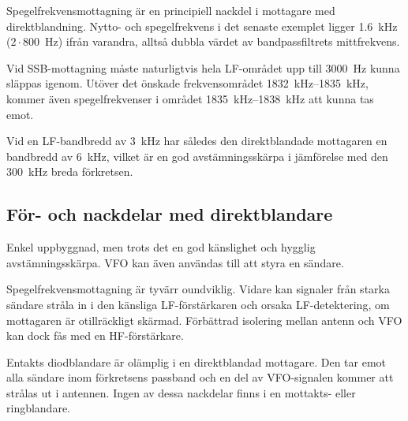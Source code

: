 Spegelfrekvensmottagning är en principiell nackdel i mottagare med
direktblandning.
Nytto- och spegelfrekvens i det senaste exemplet ligger
\SI{1,6}{\kilo\hertz} ($2\cdot 800$~\si{\hertz}) ifrån varandra, alltså dubbla värdet
av bandpassfiltrets mittfrekvens.

Vid SSB-mottagning måste naturligtvis hela LF-området upp till \SI{3000}{\hertz}
kunna släppas igenom.
Utöver det önskade frekvensområdet \SIrange{1832}{1835}{\kilo\hertz}, kommer
även spegelfrekvenser i området \SIrange{1835}{1838}{\kilo\hertz} att kunna tas
emot.

Vid en LF-bandbredd av \SI{3}{\kilo\hertz} har således den direktblandade
mottagaren en bandbredd av \SI{6}{\kilo\hertz}, vilket är en god
avstämningsskärpa i jämförelse med den \SI{300}{\kilo\hertz} breda förkretsen.

\subsection{För- och nackdelar med direkt\-blandare}

Enkel uppbyggnad, men trots det en god känslighet och hygglig avstämningsskärpa.
VFO kan även användas till att styra en sändare.

Spegelfrekvensmottagning är tyvärr oundviklig.
Vidare kan signaler från starka sändare stråla in i den känsliga LF-förstärkaren
och orsaka LF-detektering, om mottagaren är otillräckligt skärmad.
Förbättrad isolering mellan antenn och VFO kan dock fås med en HF-förstärkare.

Entakts diodblandare är olämplig i en direktblandad mottagare.
Den tar emot alla sändare inom förkretsens passband och en del av VFO-signalen
kommer att strålas ut i antennen.
Ingen av dessa nackdelar finns i en mottakts- eller ringblandare.
